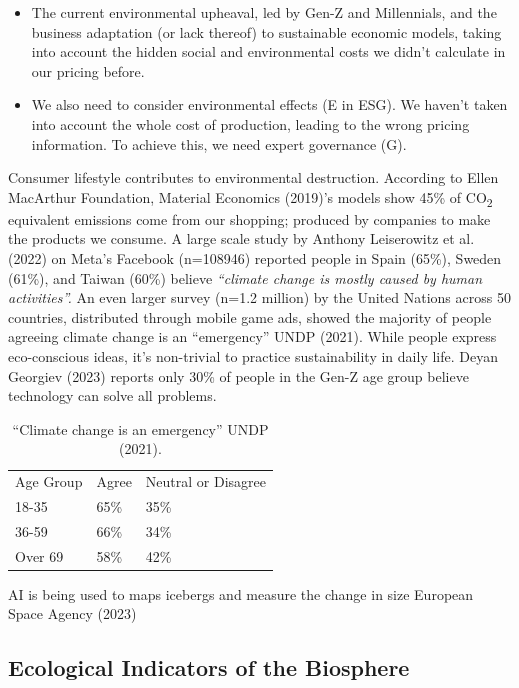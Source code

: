 \documentclass[
  letterpaper,
  DIV=11,
  numbers=noendperiod]{scrartcl}
\providecommand{\tightlist}{%
  \setlength{\itemsep}{0pt}\setlength{\parskip}{0pt}}\usepackage{longtable,booktabs,array}
\begin{document}
\begin{itemize}
\tightlist
\item
  The current environmental upheaval, led by Gen-Z and Millennials, and
  the business adaptation (or lack thereof) to sustainable economic
  models, taking into account the hidden social and environmental costs
  we didn't calculate in our pricing before.
\item
  We also need to consider environmental effects (E in ESG). We haven't
  taken into account the whole cost of production, leading to the wrong
  pricing information. To achieve this, we need expert governance (G).
\end{itemize}

Consumer lifestyle contributes to environmental destruction. According
to Ellen MacArthur Foundation, Material Economics (2019)'s models show
45\% of CO\textsubscript{2} equivalent emissions come from our shopping;
produced by companies to make the products we consume. A large scale
study by Anthony Leiserowitz et al. (2022) on Meta's Facebook (n=108946)
reported people in Spain (65\%), Sweden (61\%), and Taiwan (60\%)
believe \emph{``climate change is mostly caused by human activities''.}
An even larger survey (n=1.2 million) by the United Nations across 50
countries, distributed through mobile game ads, showed the majority of
people agreeing climate change is an ``emergency'' UNDP (2021). While
people express eco-conscious ideas, it's non-trivial to practice
sustainability in daily life. Deyan Georgiev (2023) reports only 30\% of
people in the Gen-Z age group believe technology can solve all problems.

\begin{longtable}[]{@{}lll@{}}
\caption{``Climate change is an emergency'' UNDP (2021).}\tabularnewline
\toprule\noalign{}
\endfirsthead
\endhead
\bottomrule\noalign{}
\endlastfoot
Age Group & Agree & Neutral or Disagree \\
18-35 & 65\% & 35\% \\
36-59 & 66\% & 34\% \\
Over 69 & 58\% & 42\% \\
\end{longtable}

AI is being used to maps icebergs and measure the change in size
European Space Agency (2023)

\subsection{Ecological Indicators of the
Biosphere}\label{ecological-indicators-of-the-biosphere}
\end{document}
